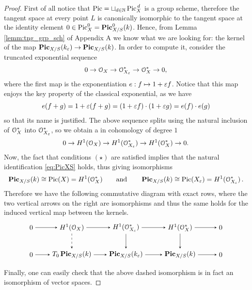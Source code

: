 	\begin{proof}
		First of all notice that $\operatorname{Pic} = \sqcup_{d\in \mathbb{N}}\operatorname{Pic}^{\,d}_X$ is a group scheme, therefore the tangent space at every point $L$ is canonically isomorphic to the tangent space at the identity element $ 0\in \operatorname{Pic}^0_X = \operatorname{\mathbf{Pic}}_{X/S}^0(k)$.
		Hence, from Lemma \ref{lemm:tng_grp_sch} of Appendix A we know what we are looking for: the kernel of the map $ \operatorname{\mathbf{Pic}}_{X/S}(k_\varepsilon)\to  \operatorname{\mathbf{Pic}}_{X/S}(k)$. In order to compute it, consider the truncated exponential sequence
		$$ 0 \to \mathcal{O}_X \to \mathcal{O}_{X_\varepsilon}^* \to \mathcal{O}_X^* \to 0, $$
		where the first map is the exponentiation $e: f\mapsto 1+\varepsilon f$. Notice that this map enjoys the key property of the classical exponential, as we have 
		$$ e(f + g) = 1+\varepsilon(f+g) = (1+\varepsilon f)\cdot(1+\varepsilon g) = e(f) \cdot e(g) $$
		so that its name is justified. The above sequence splits using the natural inclusion of $\mathcal{O}_X^*$ into $\mathcal{O}_{X_\varepsilon}^*$, so we obtain a \ses in cohomology of degree $1$
		$$ 0 \to H^1(\mathcal{O}_X) \to H^1(\mathcal{O}_{X_\varepsilon}^*) \to H^1(\mathcal{O}_X^*) \to 0. $$
		Now, the fact that conditions $(\star)$ are satisfied implies that the natural identification \eqref{eq:PicXS} holds, thus giving isomorphisms
		$$ \operatorname{\mathbf{Pic}}_{X/S}(k) \cong \operatorname{Pic}(X) = H^1(\mathcal{O}_X^*) \qquad \text{and} \qquad \operatorname{\mathbf{Pic}}_{X/S}(k) \cong \operatorname{Pic}(X_\varepsilon) = H^1(\mathcal{O}_{X_\varepsilon}^*)\,. $$
		Therefore we have the following commutative diagram with exact rows, where the two vertical arrows on the right are isomorphisms and thus the same holds for the induced vertical map between the kernels.
		$$
		\begin{tikzpicture}[node distance=4em, auto]
			\node (O) 															{$0$};
			\node (A) 	[right of=O, xshift=2em]		{$H^1(\OX)$};
			\node (A2) 	[right of=A]								{$\;$};
			\node (B) 	[right of=A2]								{$H^1(\calO_{X_\eps}^*)$};
			\node (B2) 	[right of=B]								{$\;$};
		  \node (C) 	[right of=B2] 							{$H^1(\OX^*)$};
		  \node (OO) 	[right of=C, xshift=2em] 		{$0$};
		  \node (O') 	[below of=O] 								{$0$};
		  \node (A') 	[below of=A] 								{$T_0 \PicXS(k)$};
		  \node (B') 	[below of=B] 								{$ \PicXS(k_\eps)$};
		  \node (C') 	[below of=C] 								{$ \PicXS(k)$};
		  \node (OO') [below of=OO] 							{$0$};
		  \draw[-stealth] 				(O)	to node {} (A);
		  \draw[-stealth]					(A)		to node {} (B);
		  \draw[-stealth]					(B)		to node {} (C);
		  \draw[-stealth]					(C)		to node {} (OO);
		  \draw[-stealth]					(O')	to node {} (A');
		  \draw[-stealth]					(A')	to node {} (B');
		  \draw[-stealth]					(B')	to node {} (C');
		  \draw[-stealth]					(C')	to node {} (OO');
		  \draw[-stealth][dashed]	(A)	to node {} (A');
		  \draw[-stealth]					(B)		to node {} (B');
		  \draw[-stealth]					(C)		to node {} (C');
		\end{tikzpicture}
		$$
		Finally, one can easily check that the above dashed isomorphism is in fact an isomorphism of vector spaces.
	\end{proof}

